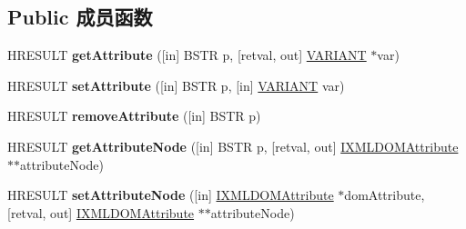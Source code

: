 \subsection*{Public 成员函数}
\begin{DoxyCompactItemize}
\item 
\mbox{\label{interface_m_s_x_m_l2_1_1_i_x_m_l_d_o_m_element_a142219db63abe9f5df5a3afdf2ac6cdd}} 
H\+R\+E\+S\+U\+LT {\bfseries get\+Attribute} (\mbox{[}in\mbox{]} B\+S\+TR p, \mbox{[}retval, out\mbox{]} \hyperlink{structtag_v_a_r_i_a_n_t}{V\+A\+R\+I\+A\+NT} $\ast$var)
\item 
\mbox{\label{interface_m_s_x_m_l2_1_1_i_x_m_l_d_o_m_element_ad6258a45fab2c53f69569f0e7194b4c5}} 
H\+R\+E\+S\+U\+LT {\bfseries set\+Attribute} (\mbox{[}in\mbox{]} B\+S\+TR p, \mbox{[}in\mbox{]} \hyperlink{structtag_v_a_r_i_a_n_t}{V\+A\+R\+I\+A\+NT} var)
\item 
\mbox{\label{interface_m_s_x_m_l2_1_1_i_x_m_l_d_o_m_element_ab235c8d8a0ceeae7785d25eb34896b5c}} 
H\+R\+E\+S\+U\+LT {\bfseries remove\+Attribute} (\mbox{[}in\mbox{]} B\+S\+TR p)
\item 
\mbox{\label{interface_m_s_x_m_l2_1_1_i_x_m_l_d_o_m_element_a6654967474f2f49af78325989cabb8f6}} 
H\+R\+E\+S\+U\+LT {\bfseries get\+Attribute\+Node} (\mbox{[}in\mbox{]} B\+S\+TR p, \mbox{[}retval, out\mbox{]} \hyperlink{interface_m_s_x_m_l2_1_1_i_x_m_l_d_o_m_attribute}{I\+X\+M\+L\+D\+O\+M\+Attribute} $\ast$$\ast$attribute\+Node)
\item 
\mbox{\label{interface_m_s_x_m_l2_1_1_i_x_m_l_d_o_m_element_aaaf8e1556fbaafd93fdf02c51c0fea9a}} 
H\+R\+E\+S\+U\+LT {\bfseries set\+Attribute\+Node} (\mbox{[}in\mbox{]} \hyperlink{interface_m_s_x_m_l2_1_1_i_x_m_l_d_o_m_attribute}{I\+X\+M\+L\+D\+O\+M\+Attribute} $\ast$dom\+Attribute, \mbox{[}retval, out\mbox{]} \hyperlink{interface_m_s_x_m_l2_1_1_i_x_m_l_d_o_m_attribute}{I\+X\+M\+L\+D\+O\+M\+Attribute} $\ast$$\ast$attribute\+Node)
\item 
\mbox{\label{interface_m_s_x_m_l2_1_1_i_x_m_l_d_o_m_element_a9c92f88f61011fb9e5811f0e1bf07ff9}} 

\end{DoxyCompactItemize}
